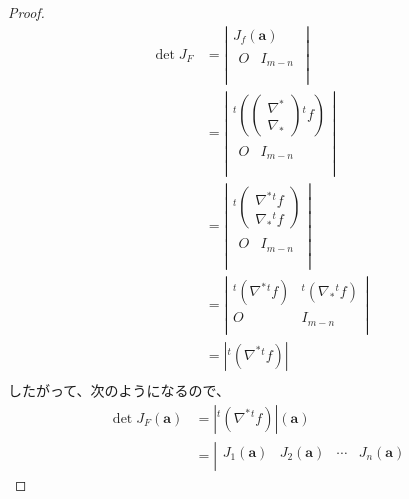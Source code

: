 \documentclass[dvipdfmx]{jsarticle}
\begin{document}
\begin{proof}
\begin{align*}
\det{J_{F}} &= \left| \begin{matrix}
J_{f}\left( \mathbf{a} \right) \\
\begin{matrix}
O & I_{m - n} \\
\end{matrix} \\
\end{matrix} \right|\\
&= \left| \begin{matrix}
{}^{t} \left( \begin{pmatrix} \nabla^{*} \\ \nabla_{*} \end{pmatrix} {}^{t} f \right) \\
\begin{matrix}
O & I_{m - n} \\
\end{matrix} \\
\end{matrix} \right|\\
&= \left| \begin{matrix}
{}^{t} \begin{pmatrix} \nabla^{*} {}^{t} f \\ \nabla_{*} {}^{t} f \end{pmatrix} \\
\begin{matrix}
O & I_{m - n} \\
\end{matrix} \\
\end{matrix} \right|\\
&= \left| \begin{matrix}
{}^{t} \left( \nabla^{*} {}^{t} f \right) & {}^{t} \left( \nabla_{*} {}^{t} f \right) \\
O & I_{m - n} \\
\end{matrix} \right|\\
&= \left| {}^{t} \left( \nabla^{*} {}^{t} f \right) \right|\\
\end{align*}
したがって、次のようになるので、
\begin{align*}
\det{J_{F}} \left( \mathbf{a} \right) &= \left| {}^{t} \left( \nabla^{*} {}^{t} f \right) \right| \left( \mathbf{a} \right) \\
&= \left| \begin{matrix}
J_{1}\left( \mathbf{a} \right) & J_{2}\left( \mathbf{a} \right) & \cdots & J_{n}\left( \mathbf{a} \right) \\

\end{matrix}
\end{align*}
\end{proof}
\end{document}
